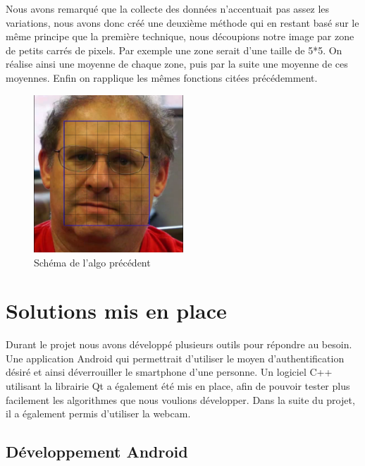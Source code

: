 Nous avons remarqué que la collecte des données n'accentuait pas assez les variations, nous avons donc créé une deuxième méthode qui en restant basé sur le même principe que la première technique, nous découpions notre image
par zone de petits carrés de pixels. Par exemple une zone serait d'une taille de 5*5. On réalise ainsi une moyenne de chaque zone, puis par la suite une moyenne de ces moyennes. Enfin on rapplique les mêmes fonctions citées précédemment.

\begin{figure}[h!]
	\centering
	\includegraphics[width=0.5\textwidth]{data/algo-schema.png}
	\caption{Schéma de l'algo précédent}
\end{figure}


\section{Solutions mis en place}

Durant le projet nous avons développé plusieurs outils pour répondre au besoin. Une application Android qui permettrait d'utiliser le moyen d'authentification désiré et ainsi déverrouiller le smartphone d'une
personne. Un logiciel C++ utilisant la librairie Qt a également été mis en place, afin de pouvoir tester plus facilement les algorithmes que nous voulions développer. Dans la suite du projet, il a également
permis d'utiliser la webcam.

\subsection{Développement Android}

